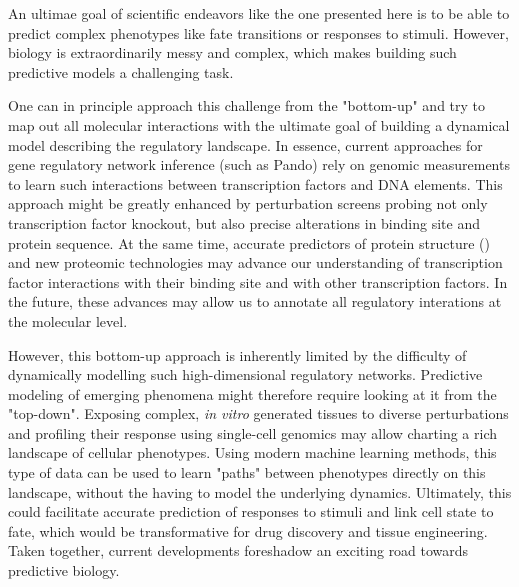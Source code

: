 An ultimae goal of scientific endeavors like the one presented here is to be able to predict complex phenotypes like fate transitions or responses to stimuli. However, biology is extraordinarily messy and complex, which makes building such predictive models a challenging task.

One can in principle approach this challenge from the "bottom-up" and try to map out all molecular interactions with the ultimate goal of building a dynamical model describing the regulatory landscape. In essence, current approaches for gene regulatory network inference (such as Pando) rely on genomic measurements to learn such interactions between transcription factors and DNA elements. This approach might be greatly enhanced by perturbation screens probing not only transcription factor knockout, but also precise alterations in binding site and protein sequence. At the same time, accurate predictors of protein structure (\cite{baek_accurate_2021,jumper_highly_2021}) and new proteomic technologies may advance our understanding of transcription factor interactions with their binding site and with other transcription factors. In the future, these advances may allow us to annotate all regulatory interations at the molecular level. 

However, this bottom-up approach is inherently limited by the difficulty of dynamically modelling such high-dimensional regulatory networks. Predictive modeling of emerging phenomena might therefore require looking at it from the "top-down". Exposing complex, \textit{in vitro} generated tissues to diverse perturbations and profiling their response using single-cell genomics may allow charting a rich landscape of cellular phenotypes. Using modern machine learning methods, this type of data can be used to learn "paths" between phenotypes directly on this landscape, without the having to model the underlying dynamics. Ultimately, this could facilitate accurate prediction of responses to stimuli and link cell state to fate, which would be transformative for drug discovery and tissue engineering. Taken together, current developments foreshadow an exciting road towards predictive biology.


